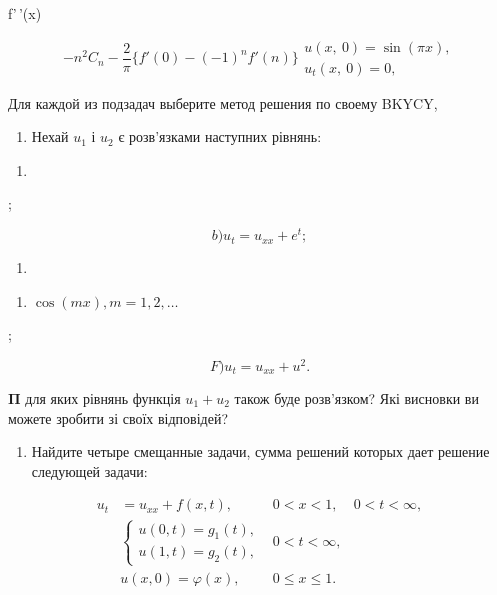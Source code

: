 \documentclass[
  ukrainian,
]{article}
\providecommand{\tightlist}{%
  \setlength{\itemsep}{0pt}\setlength{\parskip}{0pt}}
\begin{document}
f'\,'(x)

\[
-n^{2}C_{n} - \frac{2}{\pi} \{f'(0) - (-1)^{n} f'(n)\}
\begin{array}{ll} u\left(x, \ 0\right) = \sin{(\pi x)}, \\ u_{t}\left(x, \ 0\right) = 0, \end{array}
\]

Для каждой из подзадач выберите метод решения по своему BKYCY,

\begin{enumerate}
\def\labelenumi{\arabic{enumi}.}
\setcounter{enumi}{2}
\tightlist
\item
  Нехай \(u_1\) і \(u_2\) є розв'язками наступних рівнянь:
\end{enumerate}

\begin{enumerate}
\def\labelenumi{\alph{enumi})}
\tightlist
\item
\end{enumerate}

;

\[
b)  u_t = u_{xx} + e^t  ;
\]

\begin{enumerate}
\def\labelenumi{\Alph{enumi})}
\setcounter{enumi}{1}
\tightlist
\item
\end{enumerate}

\begin{enumerate}
\def\labelenumi{\arabic{enumi}.}
\setcounter{enumi}{4}
\tightlist
\item
  \(\cos(mx), m=1, 2, \dots\)
\end{enumerate}

;

\[
F)  u_t = u_{xx} + u^2  .
\]

\(\mathbf{\Pi}\) для яких рівнянь функція \(u_1 + u_2\) також буде
розв'язком? Які висновки ви можете зробити зі своїх відповідей?

\begin{enumerate}
\def\labelenumi{\arabic{enumi}.}
\setcounter{enumi}{3}
\tightlist
\item
  Найдите четыре смещанные задачи, сумма решений которых дает решение
  следующей задачи:
\end{enumerate}

\[
\begin{aligned} u_t &= u_{xx} + f(x, t), & 0 < x < 1, & 0 < t < \infty, \\ & \begin{cases} u(0, t) = g_1(t), \\ u(1, t) = g_2(t), \end{cases} & 0 < t < \infty, \\ & u(x, 0) = \varphi(x), & 0 \le x \le 1. \end{aligned}
\]
\end{document}
